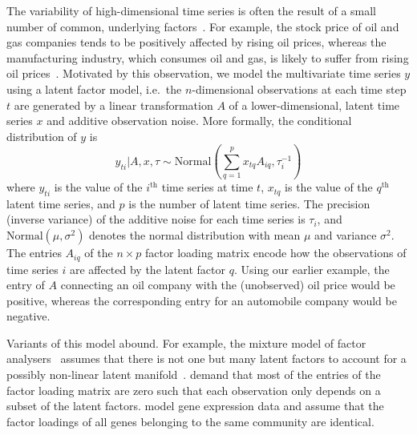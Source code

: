 \documentclass[onecolumn,pre,superscriptaddress, longbibliography, nofootinbib, notitlepage]{revtex4-1}
\newcommand{\dist}{\sim}
\newcommand{\normal}{\mathrm{Normal}}
\begin{document}
The variability of high-dimensional time series is often the result of a small number of common, underlying factors~\cite{Fama1993}. For example, the stock price of oil and gas companies tends to be positively affected by rising oil prices, whereas the manufacturing industry, which consumes oil and gas, is likely to suffer from rising oil prices~\cite{nandha2008does}. Motivated by this observation, we model the multivariate time series $y$ using a latent factor model, i.e.\ the $n$-dimensional observations at each time step $t$ are generated by a linear transformation $A$ of a lower-dimensional, latent time series $x$ and additive observation noise. More formally, the conditional distribution of $y$ is
    \begin{equation}
        y_{ti}|A, x, \tau \dist \normal \left(\sum_{q=1}^p x_{tq} A_{iq}, \tau_i^{-1}\right)\label{eq:factor-model}
    \end{equation}
where $y_{ti}$ is the value of the $i^\mathrm{th}$ time series at time $t$, $x_{tq}$ is the value of the $q^\mathrm{th}$ latent time series, and $p$ is the number of latent time series. The precision (inverse variance) of the additive noise for each time series is $\tau_i$, and $\normal(\mu, \sigma^2)$ denotes the normal distribution with mean $\mu$ and variance $\sigma^2$. The entries $A_{iq}$ of the $n\times p$ factor loading matrix encode how the observations of time series $i$ are affected by the latent factor $q$. Using our earlier example, the entry of $A$ connecting an oil company with the (unobserved) oil price would be positive, whereas the corresponding entry for an automobile company would be negative.

Variants of this model abound. For example, the mixture model of factor analysers~\cite{Ghahramani1996, Ghahramani2000} assumes that there is not one but many latent factors to account for a possibly non-linear latent manifold~\cite{Tipping1999, Taghia2017}. \citet{Huopaniemi2009, Zhao2016} demand that most of the entries of the factor loading matrix are zero such that each observation only depends on a subset of the latent factors. \citet{Inoue2007} model gene expression data and assume that the factor loadings of all genes belonging to the same community are identical.
\end{document}
